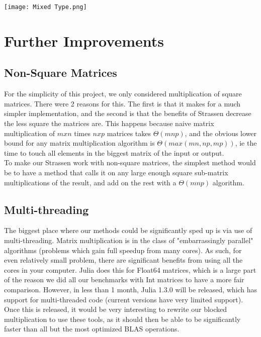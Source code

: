 \documentclass{article}         %
\begin{document}
\texttt{[image: Mixed Type.png]}

\section*{Further Improvements}
\subsection*{Non-Square Matrices}
For the simplicity of this project, we only considered multiplication of square matrices. There were 2 reasons for this. The first is that it makes for a much simpler implementation, and the second is that the benefits of Strassen decrease the less square the matrices are. This happens because naive matrix multiplication of $mxn$ times $nxp$ matrices takes $\Theta(mnp)$, and the obvious lower bound for any matrix multiplication algorithm is $\Theta(max(mn, np, mp))$, ie the time to touch all elements in the biggest matrix of the input or output.\\
To make our Strassen work with non-square matrices, the simplest method would be to have a method that calls it on any large enough square sub-matrix multiplications of the result, and add on the rest with a $\Theta(mnp)$ algorithm.\\

\subsection*{Multi-threading}
The biggest place where our methods could be significantly sped up is via use of multi-threading. Matrix multiplication is in the class of "embarrassingly parallel" algorithms (problems which gain full speedup from many cores). As such, for even relatively small problem, there are significant benefits from using all the cores in your computer. Julia does this for Float64 matrices, which is a large part of the reason we did all our benchmarks with Int matrices to have a more fair comparison. However, in less than 1 month, Julia 1.3.0 will be released, which has support for multi-threaded code (current versions have very limited support). Once this is released, it would be very interesting to rewrite our blocked multiplication to use these tools, as it should then be able to be significantly faster than all but the most optimized BLAS operations.\\
\end{document}
